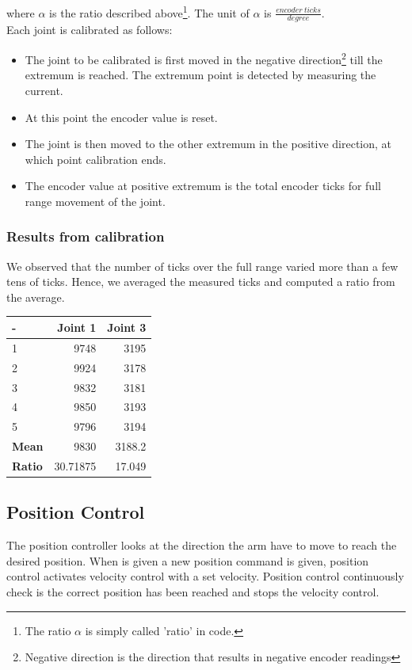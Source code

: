 \documentclass[10pt,a4paper]{article}
\begin{document}
where \(\alpha\) is the ratio described above\footnote{The ratio
  \(\alpha\) is simply called 'ratio' in code.}. The unit of
\(\alpha\) is \( \frac{encoder\ ticks}{degree}\). \\


Each joint is calibrated as follows:
\begin{itemize}
\item The joint to be calibrated is first moved in the negative
  direction\footnote{Negative direction is the direction that results
    in negative encoder readings} till the extremum is reached. The
  extremum point is detected by measuring the current.
\item At this point the encoder value is reset. 
\item The joint is then moved to the other extremum in the positive
  direction, at which point calibration ends.
\item The encoder value at positive extremum is the total encoder
  ticks for full range movement of the joint.
\end{itemize}

\subsubsection{Results from calibration}

We observed that the number of ticks over the full range varied more
than a few tens of ticks. Hence, we averaged the measured ticks and
computed a ratio from the average. \\ 

\begin{tabular}{ | l | r | r |}
\hline
- & \textbf{Joint 1} & \textbf{Joint 3} \\
\hline
1 & 9748 & 3195 \\
\hline
2 & 9924 & 3178 \\
\hline
3 & 9832 & 3181 \\
\hline
4 & 9850 & 3193 \\
\hline
5 & 9796 & 3194 \\
\hline
\textbf{Mean} & 9830 & 3188.2 \\
\hline
\textbf{Ratio} & 30.71875 & 17.049 \\
\hline

\end{tabular}

\subsection{Position Control}
The position controller looks at the direction the arm have to move to reach the desired position. When is given a new position command is given, position control activates velocity control with a set velocity. Position control continuously check is the correct position has been reached and stops the velocity control.
\end{document}
